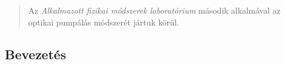 \begin{abstract}
    \noindent Az \emph{Alkalmazott fizikai módszerek laboratórium} második alkalmával az optikai pumpálás módszerét jártuk körül.
\end{abstract}

\begin{multicols}{2}
\section{Bevezetés}



\end{multicols}